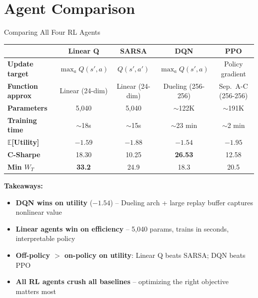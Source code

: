 \documentclass[aspectratio=169, 11pt]{beamer}
\begin{document}
\section{Agent Comparison}

\begin{frame}{Comparing All Four RL Agents}

\begin{center}
\small
\begin{tabular}{lcccc}
\toprule
& \textbf{Linear Q} & \textbf{SARSA} & \textbf{DQN} & \textbf{PPO} \\
\midrule
\textbf{Update target}      & $\max_a Q(s'\!,a)$ & $Q(s'\!, a')$ & $\max_a Q(s'\!,a)$ & Policy gradient \\
\textbf{Function approx}    & Linear (24-dim)    & Linear (24-dim)    & Dueling (256-256) & Sep.\ A-C (256-256) \\
\textbf{Parameters}         & 5,040       & 5,040       & $\sim$122K  & $\sim$191K \\
\textbf{Training time}      & $\sim$18s   & $\sim$15s   & $\sim$23 min & $\sim$2 min \\
\textbf{$\mathbb{E}$[Utility]} & $-1.59$ & $-1.88$     & $\mathbf{-1.54}$ & $-1.95$ \\
\textbf{C-Sharpe}           & 18.30       & 10.25       & \textbf{26.53} & 12.58 \\
\textbf{Min $W_T$}          & \textbf{33.2} & 24.9      & 18.3        & 20.5 \\
\bottomrule
\end{tabular}
\end{center}

\vspace{0.5em}
\textbf{Takeaways:}
\begin{itemize}
    \item \textbf{DQN wins on utility} ($-1.54$) -- Dueling arch + large replay buffer captures nonlinear value
    \item \textbf{Linear agents win on efficiency} -- 5,040 params, trains in seconds, interpretable policy
    \item \textbf{Off-policy $>$ on-policy on utility}: Linear Q beats SARSA; DQN beats PPO
    \item \textbf{All RL agents crush all baselines} -- optimizing the right objective matters most
\end{itemize}
\end{frame}
\end{document}
